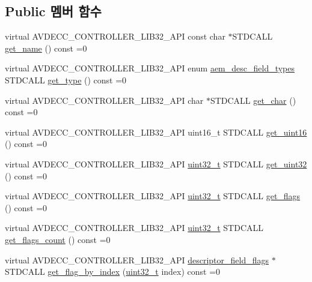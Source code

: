 \subsection*{Public 멤버 함수}
\begin{DoxyCompactItemize}
\item 
virtual A\+V\+D\+E\+C\+C\+\_\+\+C\+O\+N\+T\+R\+O\+L\+L\+E\+R\+\_\+\+L\+I\+B32\+\_\+\+A\+PI const char $\ast$S\+T\+D\+C\+A\+LL \hyperlink{classavdecc__lib_1_1descriptor__field_afee2fac8649c8be5af5f3df5f3166c68}{get\+\_\+name} () const =0
\item 
virtual A\+V\+D\+E\+C\+C\+\_\+\+C\+O\+N\+T\+R\+O\+L\+L\+E\+R\+\_\+\+L\+I\+B32\+\_\+\+A\+PI enum \hyperlink{classavdecc__lib_1_1descriptor__field_afcc9e2e668064d50ec69a4f95b154396}{aem\+\_\+desc\+\_\+field\+\_\+types} S\+T\+D\+C\+A\+LL \hyperlink{classavdecc__lib_1_1descriptor__field_a13fb4b2d5aaa12536b421520754b7b25}{get\+\_\+type} () const =0
\item 
virtual A\+V\+D\+E\+C\+C\+\_\+\+C\+O\+N\+T\+R\+O\+L\+L\+E\+R\+\_\+\+L\+I\+B32\+\_\+\+A\+PI char $\ast$S\+T\+D\+C\+A\+LL \hyperlink{classavdecc__lib_1_1descriptor__field_a10e3985d943b65630c4e6c8bd62324b7}{get\+\_\+char} () const =0
\item 
virtual A\+V\+D\+E\+C\+C\+\_\+\+C\+O\+N\+T\+R\+O\+L\+L\+E\+R\+\_\+\+L\+I\+B32\+\_\+\+A\+PI uint16\+\_\+t S\+T\+D\+C\+A\+LL \hyperlink{classavdecc__lib_1_1descriptor__field_a8d3310a715d35ddf6cef2c58ca366be3}{get\+\_\+uint16} () const =0
\item 
virtual A\+V\+D\+E\+C\+C\+\_\+\+C\+O\+N\+T\+R\+O\+L\+L\+E\+R\+\_\+\+L\+I\+B32\+\_\+\+A\+PI \hyperlink{parse_8c_a6eb1e68cc391dd753bc8ce896dbb8315}{uint32\+\_\+t} S\+T\+D\+C\+A\+LL \hyperlink{classavdecc__lib_1_1descriptor__field_a90fd17a46477c04335e6720cb99c107d}{get\+\_\+uint32} () const =0
\item 
virtual A\+V\+D\+E\+C\+C\+\_\+\+C\+O\+N\+T\+R\+O\+L\+L\+E\+R\+\_\+\+L\+I\+B32\+\_\+\+A\+PI \hyperlink{parse_8c_a6eb1e68cc391dd753bc8ce896dbb8315}{uint32\+\_\+t} S\+T\+D\+C\+A\+LL \hyperlink{classavdecc__lib_1_1descriptor__field_a9c4f9f66a180f7b55b0e16b8fd7a2da2}{get\+\_\+flags} () const =0
\item 
virtual A\+V\+D\+E\+C\+C\+\_\+\+C\+O\+N\+T\+R\+O\+L\+L\+E\+R\+\_\+\+L\+I\+B32\+\_\+\+A\+PI \hyperlink{parse_8c_a6eb1e68cc391dd753bc8ce896dbb8315}{uint32\+\_\+t} S\+T\+D\+C\+A\+LL \hyperlink{classavdecc__lib_1_1descriptor__field_a8c6324994a08dbf346eaa64b6b8be616}{get\+\_\+flags\+\_\+count} () const =0
\item 
virtual A\+V\+D\+E\+C\+C\+\_\+\+C\+O\+N\+T\+R\+O\+L\+L\+E\+R\+\_\+\+L\+I\+B32\+\_\+\+A\+PI \hyperlink{classavdecc__lib_1_1descriptor__field__flags}{descriptor\+\_\+field\+\_\+flags} $\ast$S\+T\+D\+C\+A\+LL \hyperlink{classavdecc__lib_1_1descriptor__field_a14a3fdc0e231e3fc06a168a1499325fe}{get\+\_\+flag\+\_\+by\+\_\+index} (\hyperlink{parse_8c_a6eb1e68cc391dd753bc8ce896dbb8315}{uint32\+\_\+t} index) const =0
\end{DoxyCompactItemize}


